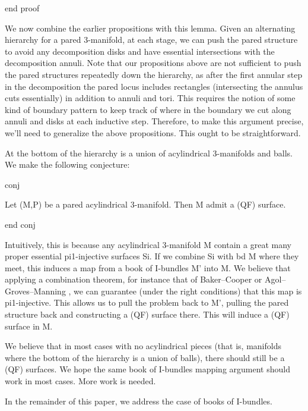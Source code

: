 end proof

We now combine the earlier propositions with this lemma. Given an alternating
hierarchy for a pared 3-manifold, at each stage, we can push the pared
structure to avoid any decomposition disks and have essential intersections
with the decomposition annuli. Note that our propositions above are not
sufficient to push the pared structures repeatedly down the hierarchy, as after
the first annular step in the decomposition the pared locus includes rectangles
(intersecting the annulus cuts essentially) in addition to annuli and tori.
This requires the notion of some kind of boundary pattern to keep track of
where in the boundary we cut along annuli and disks at each inductive step.
Therefore, to make this argument precise, we'll need to generalize the above
propositions. This ought to be straightforward.

At the bottom of the hierarchy is a union of acylindrical 3-manifolds and
balls. We make the following conjecture:

conj

Let (M,P) be a pared acylindrical 3-manifold. Then M admit a (QF) surface.

end conj

Intuitively, this is because any acylindrical 3-manifold M contain a great many
proper essential pi1-injective surfaces Si. If we combine Si with bd M where
they meet, this induces a map from a book of I-bundles M' into M. We believe
that applying a combination theorem, for instance that of Baker--Cooper
\cite{BCcombination} or Agol--Groves--Manning \cite{AGMcombination}, we can
guarantee (under the right conditions) that this map is pi1-injective. This
allows us to pull the problem back to M', pulling the pared structure back and
constructing a (QF) surface there. This will induce a (QF) surface in M.

We believe that in most cases with no acylindrical pieces (that is, manifolds
where the bottom of the hierarchy is a union of balls), there should still be
a (QF) surfaces. We hope the same book of I-bundles mapping argument should
work in most cases. More work is needed.

In the remainder of this paper, we address the case of books of I-bundles.
